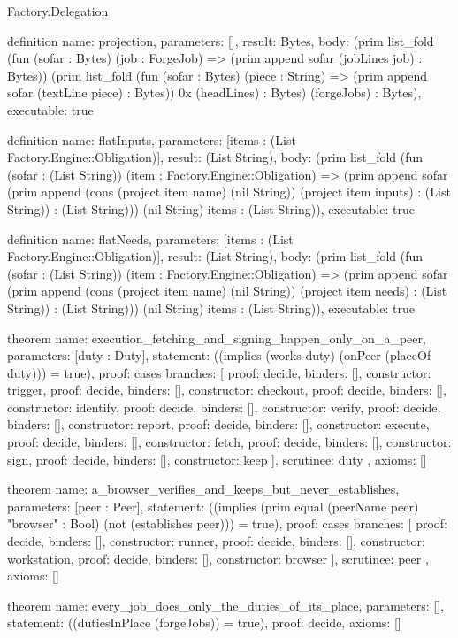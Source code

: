 \begin{lexlean}{Factory.Delegation}
\begin{semanticmodule}
definition{
  name: projection,
  parameters: [],
  result: Bytes,
  body: (prim list_fold (fun (sofar : Bytes) (job : ForgeJob) => (prim append sofar (jobLines job) : Bytes)) (prim list_fold (fun (sofar : Bytes) (piece : String) => (prim append sofar (textLine piece) : Bytes)) 0x (headLines) : Bytes) (forgeJobs) : Bytes),
  executable: true
}

definition{
  name: flatInputs,
  parameters: [items : (List Factory.Engine::Obligation)],
  result: (List String),
  body: (prim list_fold (fun (sofar : (List String)) (item : Factory.Engine::Obligation) => (prim append sofar (prim append (cons (project item name) (nil String)) (project item inputs) : (List String)) : (List String))) (nil String) items : (List String)),
  executable: true
}

definition{
  name: flatNeeds,
  parameters: [items : (List Factory.Engine::Obligation)],
  result: (List String),
  body: (prim list_fold (fun (sofar : (List String)) (item : Factory.Engine::Obligation) => (prim append sofar (prim append (cons (project item name) (nil String)) (project item needs) : (List String)) : (List String))) (nil String) items : (List String)),
  executable: true
}

theorem{
  name: execution_fetching_and_signing_happen_only_on_a_peer,
  parameters: [duty : Duty],
  statement: ((implies (works duty) (onPeer (placeOf duty))) = true),
  proof: cases{
    branches: [
      {proof: decide{}, binders: [], constructor: trigger},
      {proof: decide{}, binders: [], constructor: checkout},
      {proof: decide{}, binders: [], constructor: identify},
      {proof: decide{}, binders: [], constructor: verify},
      {proof: decide{}, binders: [], constructor: report},
      {proof: decide{}, binders: [], constructor: execute},
      {proof: decide{}, binders: [], constructor: fetch},
      {proof: decide{}, binders: [], constructor: sign},
      {proof: decide{}, binders: [], constructor: keep}
    ],
    scrutinee: duty
  },
  axioms: []
}

theorem{
  name: a_browser_verifies_and_keeps_but_never_establishes,
  parameters: [peer : Peer],
  statement: ((implies (prim equal (peerName peer) "browser" : Bool) (not (establishes peer))) = true),
  proof: cases{
    branches: [
      {proof: decide{}, binders: [], constructor: runner},
      {proof: decide{}, binders: [], constructor: workstation},
      {proof: decide{}, binders: [], constructor: browser}
    ],
    scrutinee: peer
  },
  axioms: []
}

theorem{
  name: every_job_does_only_the_duties_of_its_place,
  parameters: [],
  statement: ((dutiesInPlace (forgeJobs)) = true),
  proof: decide{},
  axioms: []
}


\end{semanticmodule}
\end{lexlean}
